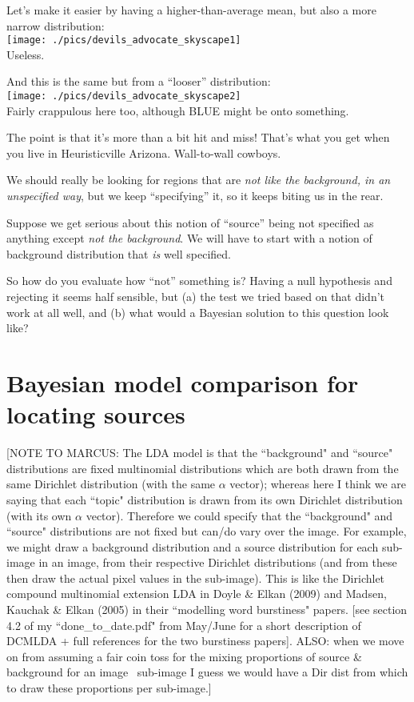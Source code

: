 \documentclass[11pt]{article}
\begin{document}
Let's make it easier by having a higher-than-average mean, but also a more narrow distribution: \\
\texttt{[image: ./pics/devils\_advocate\_skyscape1]}\\
Useless.

And this is the same but from a ``looser'' distribution:\\
\texttt{[image: ./pics/devils\_advocate\_skyscape2]}\\
Fairly crappulous here too, although BLUE might be onto something.

The point is that it's more than a bit hit and miss! That's what you
get when you live in Heuristicville Arizona. Wall-to-wall cowboys.

We should really be looking for regions that are {\it not like the
  background, in an unspecified way}, but we keep ``specifying'' it,
so it keeps biting us in the rear.

Suppose we get serious about this notion of ``source'' being not specified as anything except {\it not the background}. We will have to start with a notion of background distribution that {\it is} well specified. 

So how do you evaluate how ``not'' something is?  Having a null
hypothesis and rejecting it seems half sensible, but (a) the test we
tried based on that didn't work at all well, and (b) what would a
Bayesian solution to this question look like?


\section{Bayesian model comparison for locating sources}

[NOTE TO MARCUS: The LDA model is that the ``background" and ``source" distributions are fixed multinomial distributions which are both drawn from the same Dirichlet distribution (with the same $\alpha$ vector); whereas here I think we are saying that each ``topic" distribution is drawn from its own Dirichlet distribution (with its own $\alpha$ vector). Therefore we could specify that the ``background" and ``source" distributions are not fixed but can/do vary over the image. For example, we might draw a background distribution and a source distribution for each sub-image in an image, from their respective Dirichlet distributions (and from these then draw the actual pixel values in the sub-image). This is like the Dirichlet compound multinomial extension LDA in Doyle \& Elkan (2009) and Madsen, Kauchak \& Elkan (2005) in their ``modelling word burstiness" papers. [see section 4.2 of my ``done\_to\_date.pdf" from May/June for a short description of DCMLDA + full references for the two burstiness papers]. ALSO: when we move on from assuming a fair coin toss for the mixing proportions of source \& background for an image \ sub-image I guess we would have a Dir dist from which to draw these proportions per sub-image.]
\end{document}
